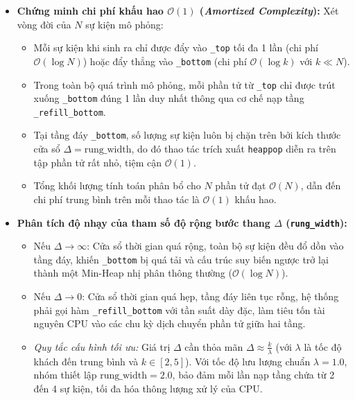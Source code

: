 \begin{itemize}[leftmargin=1.5em, itemsep=3pt]
\item \textbf{Chứng minh chi phí khấu hao $\mathcal{O}(1)$ (\textit{Amortized Complexity}):}
Xét vòng đời của $N$ sự kiện mô phỏng:
\begin{itemize}[leftmargin=1.2em, itemsep=1pt]
\item Mỗi sự kiện khi sinh ra chỉ được đẩy vào \texttt{\_top} tối đa 1 lần (chi phí $\mathcal{O}(\log N)$) hoặc đẩy thẳng vào \texttt{\_bottom} (chi phí $\mathcal{O}(\log k)$ với $k \ll N$).
\item Trong toàn bộ quá trình mô phỏng, mỗi phần tử từ \texttt{\_top} chỉ được trút xuống \texttt{\_bottom} đúng 1 lần duy nhất thông qua cơ chế nạp tầng \texttt{\_refill\_bottom}.
\item Tại tầng đáy \texttt{\_bottom}, số lượng sự kiện luôn bị chặn trên bởi kích thước cửa sổ $\Delta = \text{rung\_width}$, do đó thao tác trích xuất \texttt{heappop} diễn ra trên tập phần tử rất nhỏ, tiệm cận $\mathcal{O}(1)$.
\item Tổng khối lượng tính toán phân bổ cho $N$ phần tử đạt $\mathcal{O}(N)$, dẫn đến chi phí trung bình trên mỗi thao tác là $\mathcal{O}(1)$ khấu hao.
\end{itemize}
\item \textbf{Phân tích độ nhạy của tham số độ rộng bước thang $\Delta$ (\texttt{rung\_width}):}
\begin{itemize}[leftmargin=1.2em, itemsep=1pt]
\item Nếu $\Delta \to \infty$: Cửa sổ thời gian quá rộng, toàn bộ sự kiện đều đổ dồn vào tầng đáy, khiến \texttt{\_bottom} bị quá tải và cấu trúc suy biến ngược trở lại thành một Min-Heap nhị phân thông thường ($\mathcal{O}(\log N)$).
\item Nếu $\Delta \to 0$: Cửa sổ thời gian quá hẹp, tầng đáy liên tục rỗng, hệ thống phải gọi hàm \texttt{\_refill\_bottom} với tần suất dày đặc, làm tiêu tốn tài nguyên CPU vào các chu kỳ dịch chuyển phần tử giữa hai tầng.
\item \textit{Quy tắc cấu hình tối ưu:} Giá trị $\Delta$ cần thỏa mãn $\Delta \approx \frac{k}{\lambda}$ (với $\lambda$ là tốc độ khách đến trung bình và $k \in [2, 5]$). Với tốc độ lưu lượng chuẩn $\lambda = 1.0$, nhóm thiết lập $\text{rung\_width} = 2.0$, bảo đảm mỗi lần nạp tầng chứa từ 2 đến 4 sự kiện, tối đa hóa thông lượng xử lý của CPU.
\end{itemize}
\end{itemize}


